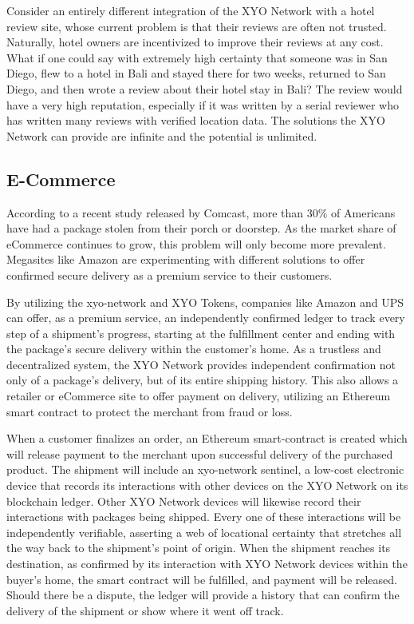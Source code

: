 \documentclass{article}
\begin{document}
Consider an entirely different integration of the XYO Network with a hotel review site, whose current problem is that their reviews are often not trusted. Naturally, hotel owners are incentivized to improve their reviews at any cost. What if one could say with extremely high \gls{certainty} that someone was in San Diego, flew to a hotel in Bali and stayed there for two weeks, returned to San Diego, and then wrote a review about their hotel stay in Bali? The review would have a very high reputation, especially if it was written by a serial reviewer who has written many reviews with verified location data. The solutions the XYO Network can provide are infinite and the potential is unlimited.

\subsection{E-Commerce}

According to a recent study released by Comcast, more than 30\% of Americans have had a package stolen from their porch or doorstep. As the market share of eCommerce continues to grow, this problem will only become more prevalent. Megasites like Amazon are experimenting with different solutions to offer confirmed secure delivery as a premium service to their customers.

By utilizing the \Gls{xyo-network} and XYO Tokens, companies like Amazon and UPS can offer, as a premium service, an independently confirmed ledger to track every step of a shipment's progress, starting at the fulfillment center and ending with the package's secure delivery within the customer's home. As a trustless and decentralized system, the XYO Network provides independent confirmation not only of a package's delivery, but of its entire shipping history. This also allows a retailer or eCommerce site to offer payment on delivery, utilizing an Ethereum smart contract to protect the merchant from fraud or loss.

When a customer finalizes an order, an Ethereum \gls{smart-contract} is created which will release payment to the merchant upon successful delivery of the purchased product. The shipment will include an \Gls{xyo-network} \Gls{sentinel}, a low-cost electronic device that records its interactions with other devices on the XYO Network on its blockchain ledger. Other XYO Network devices will likewise record their interactions with packages being shipped. Every one of these interactions will be independently verifiable, asserting a web of locational certainty that stretches all the way back to the shipment's point of origin. When the shipment reaches its destination, as confirmed by its interaction with XYO Network devices within the buyer's home, the smart contract will be fulfilled, and payment will be released. Should there be a dispute, the ledger will provide a history that can confirm the delivery of the shipment or show where it went off track.
\end{document}
